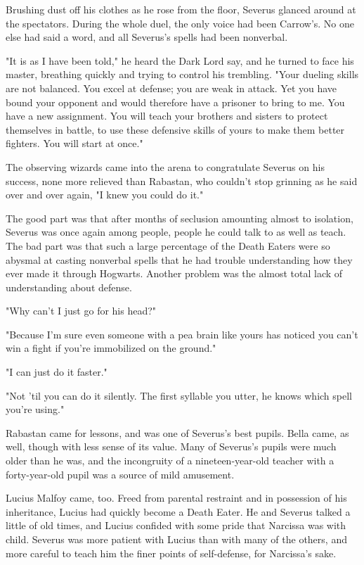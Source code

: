 \documentclass[a4paper,11pt]{article}
\begin{document}
Brushing dust off his clothes as he rose from the floor, Severus glanced around at the spectators. During the whole duel, the only voice had been Carrow's. No one else had said a word, and all Severus's spells had been nonverbal.

"It is as I have been told," he heard the Dark Lord say, and he turned to face his master, breathing quickly and trying to control his trembling. "Your dueling skills are not balanced. You excel at defense; you are weak in attack. Yet you have bound your opponent and would therefore have a prisoner to bring to me. You have a new assignment. You will teach your brothers and sisters to protect themselves in battle, to use these defensive skills of yours to make them better fighters. You will start at once."

The observing wizards came into the arena to congratulate Severus on his success, none more relieved than Rabastan, who couldn't stop grinning as he said over and over again, "I knew you could do it."

The good part was that after months of seclusion amounting almost to isolation, Severus was once again among people, people he could talk to as well as teach. The bad part was that such a large percentage of the Death Eaters were so abysmal at casting nonverbal spells that he had trouble understanding how they ever made it through Hogwarts. Another problem was the almost total lack of understanding about defense.

"Why can't I just go for his head?"

"Because I'm sure even someone with a pea brain like yours has noticed you can't win a fight if you're immobilized on the ground."

"I can just do it faster."

"Not 'til you can do it silently. The first syllable you utter, he knows which spell you're using."

Rabastan came for lessons, and was one of Severus's best pupils. Bella came, as well, though with less sense of its value. Many of Severus's pupils were much older than he was, and the incongruity of a nineteen-year-old teacher with a forty-year-old pupil was a source of mild amusement.

Lucius Malfoy came, too. Freed from parental restraint and in possession of his inheritance, Lucius had quickly become a Death Eater. He and Severus talked a little of old times, and Lucius confided with some pride that Narcissa was with child. Severus was more patient with Lucius than with many of the others, and more careful to teach him the finer points of self-defense, for Narcissa's sake.
\end{document}
